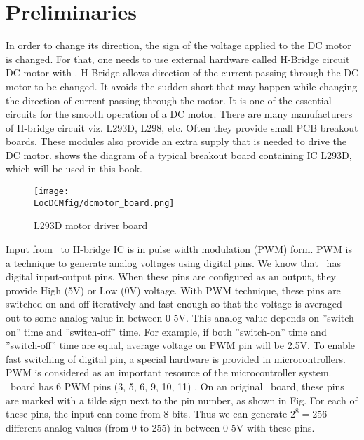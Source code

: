 \section{Preliminaries}
In order to change its direction, the sign of the voltage applied to
the DC motor is changed.  For that, one needs to use external hardware
called %
H-Bridge circuit DC motor with \arduino. %
H-Bridge allows direction of the current passing through the DC motor
to be changed. It avoids the sudden short that may happen while
changing the direction of current passing through the motor.  It is
one of the essential circuits for the smooth operation of a DC
motor. There are many manufacturers of H-bridge circuit viz.
%
L293D, L298, etc.  Often they provide small %
PCB breakout boards.  These modules also provide an extra supply that
is needed to drive the DC motor.   shows
the diagram of a typical breakout board containing IC L293D, which will
be used in this book. \par

\begin{figure}
  \centering
  \texttt{[image: \\LocDCMfig/dcmotor\_board.png]}
  \caption{L293D motor driver board}
  \label{fig:motordriverboard}
\end{figure}

Input from \arduino\ to H-bridge IC is in %
pulse width modulation (PWM) form. PWM is a technique to generate
analog voltages using digital pins. We know that \arduino\ has digital
input-output pins. When these pins are configured as an output, they
provide High (5V) or Low (0V) voltage. With PWM technique, these pins
are switched on and off iteratively and fast enough so that the
voltage is averaged out to some analog value in between 0-5V. This
analog value depends on ''switch-on'' time and ''switch-off''
time. For example, if both ''switch-on'' time and ''switch-off'' time
are equal, average voltage on PWM pin will be 2.5V. To enable fast
switching of digital pin, a special hardware is provided in
microcontrollers.  PWM is considered as an important resource of
the microcontroller system. \arduino\ board has 6 PWM pins (3, 5, 6, 9, 10, 11) \cite{arduino-pwm}. 
On an original \arduino\ board, these pins are marked with a tilde sign next to the pin number, 
as shown in Fig. For each of these pins, the input can come from 8 bits.
Thus we can generate $2^8 = 256$ different analog values (from 0 to 255) 
in between 0-5V with these pins.

